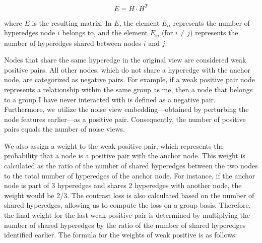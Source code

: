 \[ E = H \cdot H^T \]

where \(E\) is the resulting matrix. In \(E\), the element \(E_{ii}\) represents the number of hyperedges node \(i\) belongs to, and the element \(E_{ij}\) (for \(i \neq j\)) represents the number of hyperedges shared between nodes \(i\) and \(j\).


Nodes that share the same hyperedge in the original view are considered weak positive pairs. All other nodes, which do not share a hyperedge with the anchor node, are categorized as negative pairs. For example, if a weak positive pair node represents a relationship within the same group as me, then a node that belongs to a group I have never interacted with is defined as a negative pair. Furthermore, we utilize the noise view embedding—obtained by perturbing the node features earlier—as a positive pair. Consequently, the number of positive pairs equals the number of noise views.


We also assign a weight to the weak positive pair, which represents the probability that a node is a positive pair with the anchor node. This weight is calculated as the ratio of the number of shared hyperedges between the two nodes to the total number of hyperedges of the anchor node. For instance, if the anchor node is part of 3 hyperedges and shares 2 hyperedges with another node, the weight would be 2/3. The contrast loss is also calculated based on the number of shared hyperedges, allowing us to compute the loss on a group basis. Therefore, the final weight for the last weak positive pair is determined by multiplying the number of shared hyperedges by the ratio of the number of shared hyperedges identified earlier. The formula for the weights of weak positive is as follows:




